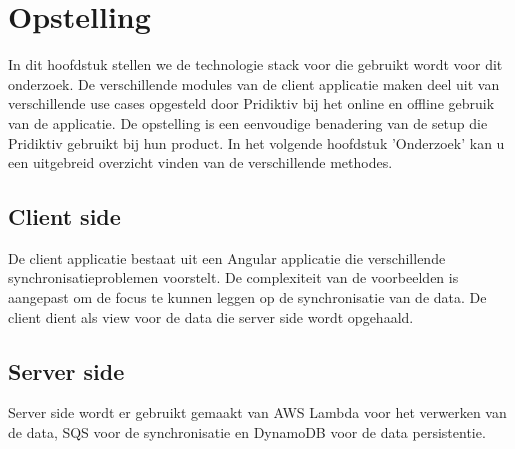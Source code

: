 
\chapter{Opstelling}
\label{ch:setup}


In dit hoofdstuk stellen we de technologie stack voor die gebruikt wordt voor dit onderzoek. De verschillende modules van de client applicatie maken deel uit van verschillende use cases opgesteld door Pridiktiv bij het online en offline gebruik van de applicatie. De opstelling is een eenvoudige benadering van de setup die Pridiktiv gebruikt bij hun product. In het volgende hoofdstuk 'Onderzoek' kan u een uitgebreid overzicht vinden van de verschillende methodes. 

\section{Client side}
De client applicatie bestaat uit een Angular applicatie die verschillende synchronisatieproblemen voorstelt. De complexiteit van de voorbeelden is aangepast om de focus te kunnen leggen op de synchronisatie van de data. De client dient als view voor de data die server side wordt opgehaald.
\section{Server side}
Server side wordt er gebruikt gemaakt van AWS Lambda voor het verwerken van de data, SQS voor de synchronisatie en DynamoDB voor de data persistentie.